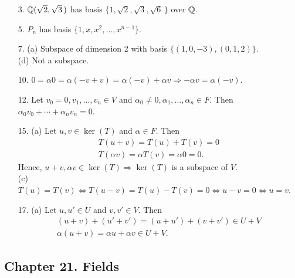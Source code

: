 {\small
\begin{itemize}
 
\item[3.] 
${\Bbb Q}(\sqrt{2}, \sqrt{3}\, )$ has basis $\{ 1, \sqrt{2}, \sqrt{3},
\sqrt{6}\, \}$  over ${\Bbb Q}$.
 
\item[5.]
$P_n$ has basis $\{ 1, x, x^2, \ldots, x^{n-1} \}$.
 
\item[7.]
(a) Subspace of dimension 2 with basis $\{(1, 0, -3), (0, 1,
2) \}$.\\
(d) Not a subspace.
 
\item[10.]
$0 =  \alpha 0 = \alpha(-v+v) = \alpha(-v) + \alpha v \Rightarrow 
-\alpha v = \alpha(-v)$.
 
\item[12.]
Let $v_0 = 0, v_1, \ldots, v_n \in V$ and $\alpha_0 \neq 0, \alpha_1,
\ldots, \alpha_n \in F$. Then $\alpha_0 v_0 + \cdots + \alpha_n v_n =
0$.
 
\item[15.]
(a)
Let $u, v \in \ker(T)$ and $\alpha \in F$.  Then
\[
\begin{array}{c}
T(u +v) = T(u) + T(v) = 0 \\
T(\alpha v) = \alpha T(v) = \alpha 0 = 0.
\end{array}
\]
Hence, $u + v, \alpha v \in \ker(T) \Rightarrow \ker(T)$ is 
a subspace of
$V$. \\
(c) 
$T(u) = T(v) \Leftrightarrow T(u-v) = T(u) - T(v) = 0
\Leftrightarrow u-v = 0 \Leftrightarrow u = v$.
 
 
\item[17.]
(a)
Let $u, u' \in U$ and $v, v' \in V$. Then
\[
\begin{array}{c}
(u + v) + (u' + v') = (u + u') + (v + v') \in U + V \\
\alpha(u + v) = \alpha u + \alpha v \in U + V.
\end{array}
\]
 
\end{itemize}
}
 
\subsection*{Chapter 21. Fields}
 
